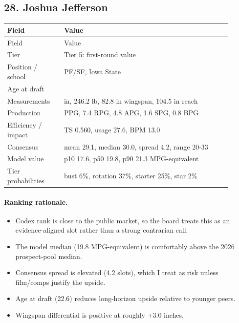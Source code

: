 \documentclass[11pt]{article}
\begin{document}
\subsection{28. Joshua Jefferson}
\begin{center}
\scriptsize
\begin{longtable}{@{}>{\raggedright\arraybackslash}p{0.230\linewidth}>{\raggedright\arraybackslash}p{0.680\linewidth}@{}}
\toprule
Field & Value \\
\midrule
\endfirsthead
\toprule
Field & Value \\
\midrule
\endhead
Tier & Tier 5: first-round value \\
Position / school & PF/SF, Iowa State \\
Age at draft & 22.6 \\
Measurements & 79.8 in, 246.2 lb, 82.8 in wingspan, 104.5 in reach \\
Production & 16.4 PPG, 7.4 RPG, 4.8 APG, 1.6 SPG, 0.8 BPG \\
Efficiency / impact & TS 0.560, usage 27.6, BPM 13.0 \\
Consensus & mean 29.1, median 30.0, spread 4.2, range 20-33 \\
Model value & p10 17.6, p50 19.8, p90 21.3 MPG-equivalent \\
Tier probabilities & bust 6\%, rotation 37\%, starter 25\%, star 2\% \\
\bottomrule
\end{longtable}
\end{center}

\paragraph{Ranking rationale.}
\begin{itemize}[leftmargin=*]
\item Codex rank is close to the public market, so the board treats this as an evidence-aligned slot rather than a strong contrarian call.
\item The model median (19.8 MPG-equivalent) is comfortably above the 2026 prospect-pool median.
\item Consensus spread is elevated (4.2 slots), which I treat as risk unless film/comps justify the upside.
\item Age at draft (22.6) reduces long-horizon upside relative to younger peers.
\item Wingspan differential is positive at roughly +3.0 inches.
\end{itemize}
\end{document}
